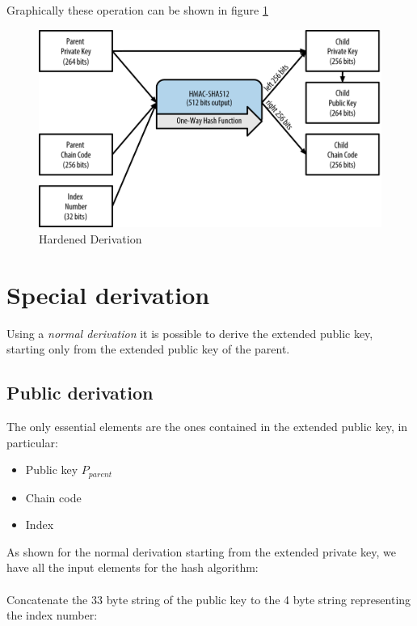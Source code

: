 \begin{flushleft}
	Graphically these operation can be shown in figure \ref{fig:hardened_derivation}
\end{flushleft}

\begin{figure}[ht!]
	\centering
	\includegraphics[width=15cm]{Figures/hardened_derivation.png}
	\caption{Hardened Derivation }
	\label{fig:hardened_derivation}
\end{figure}


\section{Special derivation}
Using a \textit{normal derivation} it is possible to derive the extended public key, starting only from the extended public key of the parent.

\subsection{Public derivation}

The only essential elements are the ones contained in the extended public key, in particular:

\begin{itemize}
	\item Public key $P_{parent}$
	\item Chain code
	\item Index
\end{itemize}

As shown for the normal derivation starting from the extended private key, we have all the input elements for the hash algorithm:
\\ \\
Concatenate the 33 byte string of the public key to the 4 byte string representing the index number:

